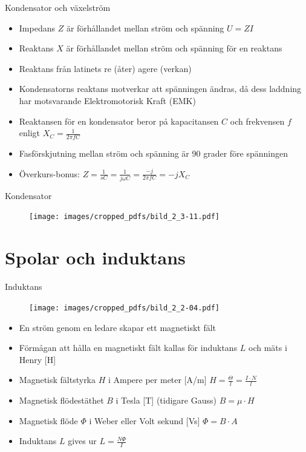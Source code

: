 \documentclass{beamer}
\begin{document}
\begin{frame}{Kondensator och växelström}
  \begin{itemize}
  \item Impedans $Z$ är förhållandet mellan ström och spänning $U=ZI$
  \item Reaktans $X$ är förhållandet mellan ström och spänning för en reaktans
  \item Reaktans från latinets re (åter) agere (verkan)
  \item Kondensatorns reaktans motverkar att spänningen ändras, då dess laddning har motsvarande Elektromotorisk Kraft (EMK)
  \item Reaktansen för en kondensator beror på kapacitansen $C$ och frekvensen $f$ enligt $X_C = \frac{1}{2\pi f C}$
  \item Fasförskjutning mellan ström och spänning är 90 grader före spänningen
  \item Överkurs-bonus: $Z = \frac{1}{sC} = \frac{1}{j\omega C} = \frac{-j}{2\pi f C} = -jX_C$
  \end{itemize}
\end{frame}

\begin{frame}{Kondensator}

\begin{figure}[h]
\texttt{[image: images/cropped\_pdfs/bild\_2\_3-11.pdf]}
\end{figure}

\end{frame}

\section{Spolar och induktans}

\begin{frame}{Induktans}

\begin{figure}[h]
\texttt{[image: images/cropped\_pdfs/bild\_2\_2-04.pdf]}
\end{figure}

\begin{itemize}
  \item En ström genom en ledare skapar ett magnetiskt fält
  \item Förmågan att hålla en magnetiskt fält kallas för induktans $L$ och mäts i Henry [H]
  \item Magnetisk fältstyrka $H$ i Ampere per meter [A/m] $H=\frac{\Theta}{l} = \frac{I \cdot N}{l}$
  \item Magnetisk flödestäthet $B$ i Tesla [T] (tidigare Gauss) $B = \mu \cdot H$
  \item Magnetisk flöde $\Phi$ i Weber eller Volt sekund [Vs] $\Phi = B \cdot A$
  \item Induktans $L$ gives ur $L=\frac{N\Phi}{I}$
\end{itemize}
\end{frame}
\end{document}
